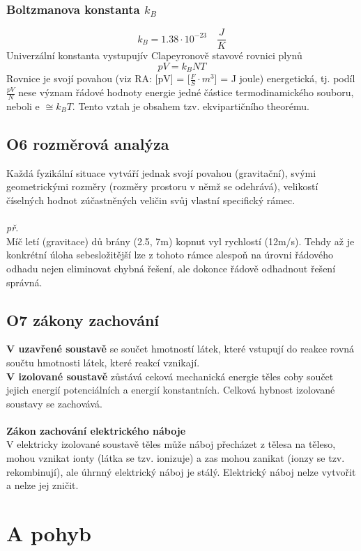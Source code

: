 \documentclass{article}
\begin{document}
\subsubsection*{Boltzmanova konstanta $k_B$}
\[
k_B = 1.38 \cdot 10^{-23} \quad \frac{J}{K}
\]
Univerzální konstanta vystupujív  Clapeyronově stavové rovnici plynů
\[
pV = k_BNT
\]
Rovnice je svojí povahou (viz RA: [pV] = [$\frac{F}{S}\cdot m^3$] = J joule) energetická, tj. podíl $\frac{pV}{N}$ nese význam řádové hodnoty energie jedné částice termodinamického souboru, neboli e $\cong k_BT$. Tento vztah je obsahem tzv. ekvipartičního theorému. 

\subsection*{O6 rozměrová analýza}
Každá fyzikální situace vytváří jednak svojí povahou (gravitační), svými geometrickými rozměry (rozměry prostoru v němž se odehrává), velikostí číselných hodnot zúčastněných veličin svůj vlastní specifický rámec.\\\\ 
\emph{př.} \\
Míč letí (gravitace) dů brány (2.5, 7m) kopnut vyl rychlostí (12m/s). Tehdy až je konkrétní úloha sebesložitější lze z tohoto rámce alespoň na úrovni řádového odhadu nejen eliminovat chybná řešení, ale dokonce řádově odhadnout řešení správná. 

\subsection*{O7 zákony zachování}
\textbf{V uzavřené soustavě} se součet hmotností látek, které vstupují do reakce rovná součtu hmotnosti látek, které reakcí vznikají.\\ 
\textbf{V izolované soustavě} zůstává ceková mechanická energie těles coby součet jejich energií potenciálních a energií konstantních. Celková hybnost izolované soustavy se zachovává. \\\\
\textbf{Zákon zachování elektrického náboje}\\
V elektricky izolované soustavě těles může náboj přecházet z tělesa na těleso, mohou vznikat ionty (látka se tzv. ionizuje) a zas mohou zanikat (ionzy se tzv. rekombinují), ale úhrnný elektrický náboj je stálý. Elektrický náboj nelze vytvořit a nelze jej zničit. 

\section*{A pohyb}
\end{document}
